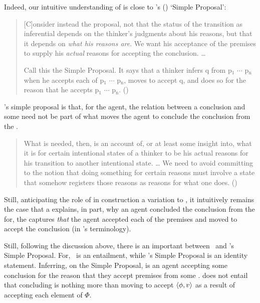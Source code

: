 \begin{note}
  Indeed, our intuitive understanding of \ros{} is close to \citeauthor{Wright:2014tt}'s (\citeyear{Wright:2014tt}) `Simple Proposal':
  \begin{quote}
    [C]onsider instead the proposal, not that the status of the transition as inferential depends on the thinker's judgments about his reasons, but that it depends on \emph{what his reasons are}.
    We want his acceptance of the premises to supply his \emph{actual} reasons for accepting the conclusion.
    \dots

    Call this the Simple Proposal.
    It says that a thinker infers q from p\(_{1}\) \(\cdots\) p\(_{\text{n}}\) when he accepts each of p\(_{1}\) \(\cdots\) p\(_{\text{n}}\), moves to accept q, and does so for the reason that he accepts p\(_{1}\) \(\cdots\) p\(_{\text{n}}\).%
    \mbox{}\hfill\mbox{(\citeyear[33]{Wright:2014tt})}
  \end{quote}

  \citeauthor{Wright:2014tt}'s simple proposal is that, for the agent, the relation between a conclusion and some \poP{} need not be part of what moves the agent to conclude the conclusion from the \poP{}.

  \begin{quote}
    What is needed, then, is an account of, or at least some insight into, what it is for certain intentional states of a thinker to be his actual reasons for his transition to another intentional state.
    \dots
    We need to avoid committing to the notion that doing something for certain reasons must involve a state that somehow registers those reasons as reasons for what one does.%
    \mbox{}\hfill\mbox{(\citeyear[34]{Wright:2014tt})}
  \end{quote}

  Still, anticipating the role of \ros{} in construction a variation to \qWhy{}, it intuitively remains the case that a \ros{} explains, in part, why an agent concluded the conclusion from the \poP{} for, the \ros{} captures \emph{that} the agent accepted each of the premises and moved to accept the conclusion (in \citeauthor{Wright:2014tt}'s terminology).

  Still, following the discussion above, there is an important between~\supportI{} and \citeauthor{Wright:2014tt}'s Simple Proposal.
  For,~\supportI{} is an entailment, while \citeauthor{Wright:2014tt}'s Simple Proposal is an identity statement.
  Inferring, on the Simple Proposal, is an agent accepting some conclusion for the reason that they accept premises from some \poP{}.
  \supportI{} does not entail that concluding is nothing more than moving to accept \(\langle \phi, v \rangle\) as a result of accepting each element of \(\Phi\).
\end{note}

